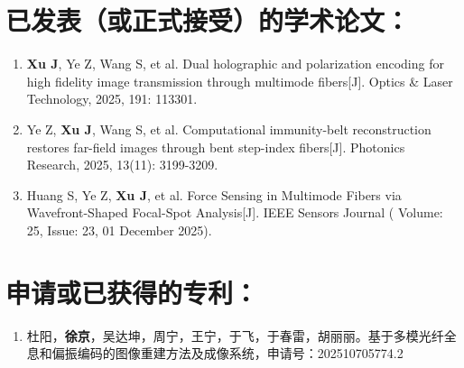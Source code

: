 \section*{已发表（或正式接受）的学术论文：}
{
\setlist[enumerate]{}%
\begin{enumerate}[nosep]
    \item \textbf{Xu J}, Ye Z, Wang S, et al. Dual holographic and polarization encoding for high fidelity image transmission through multimode fibers[J]. Optics \& Laser Technology, 2025, 191: 113301.
    \item Ye Z, \textbf{Xu J}, Wang S, et al. Computational immunity-belt reconstruction restores far-field images through bent step-index fibers[J]. Photonics Research, 2025, 13(11): 3199-3209.
    \item Huang S, Ye Z, \textbf{Xu J}, et al. Force Sensing in Multimode Fibers via Wavefront-Shaped Focal-Spot Analysis[J]. IEEE Sensors Journal ( Volume: 25, Issue: 23, 01 December 2025).
\end{enumerate}
}

\section*{申请或已获得的专利：}
{
\setlist[enumerate]{}%
\begin{enumerate}[nosep]
    \item 杜阳，\textbf{徐京}，吴达坤，周宁，王宁，于飞，于春雷，胡丽丽。基于多模光纤全息和偏振编码的图像重建方法及成像系统，申请号：202510705774.2
\end{enumerate}
}

\cleardoublepage[plain]%

